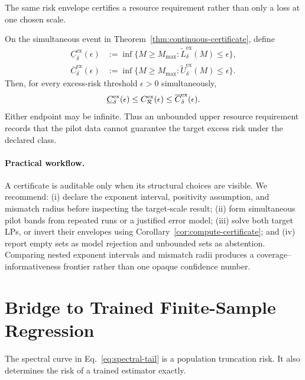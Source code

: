 The same risk envelope certifies a resource requirement rather than only a loss at one chosen scale.

\begin{corollary}
\label{cor:compute-certificate}
On the simultaneous event in Theorem~\ref{thm:continuous-certificate}, define
\begin{align}
 \underline C^{\mathrm{ex}}_\delta(\epsilon)
 &:=\inf\{M\ge M_{\max}:
 \widetilde L^{\mathrm{ex}}_\delta(M)\le\epsilon\},\\
 \overline C^{\mathrm{ex}}_\delta(\epsilon)
 &:=\inf\{M\ge M_{\max}:
 \widetilde U^{\mathrm{ex}}_\delta(M)\le\epsilon\}.
 \label{eq:compute-certificate}
\end{align}
Then, for every excess-risk threshold $\epsilon>0$ simultaneously,
\begin{equation}
 \underline C^{\mathrm{ex}}_\delta(\epsilon)
 \le C^{\mathrm{ex}}_{\mathcal{R}}(\epsilon)
 \le \overline C^{\mathrm{ex}}_\delta(\epsilon).
 \label{eq:compute-coverage}
\end{equation}
Either endpoint may be infinite. Thus an unbounded upper resource requirement records that the pilot data cannot guarantee the target excess risk under the declared class.
\end{corollary}

\paragraph{Practical workflow.}
A certificate is auditable only when its structural choices are visible. We recommend: (i) declare the exponent interval, positivity assumption, and mismatch radius before inspecting the target-scale result; (ii) form simultaneous pilot bands from repeated runs or a justified error model; (iii) solve both target LPs, or invert their envelopes using Corollary~\ref{cor:compute-certificate}; and (iv) report empty sets as model rejection and unbounded sets as abstention. Comparing nested exponent intervals and mismatch radii produces a coverage--informativeness frontier rather than one opaque confidence number.

\section{Bridge to Trained Finite-Sample Regression}

The spectral curve in Eq.~\eqref{eq:spectral-tail} is a population truncation risk. It also determines the risk of a trained estimator exactly.

